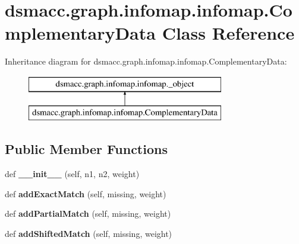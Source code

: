 \hypertarget{classdsmacc_1_1graph_1_1infomap_1_1infomap_1_1ComplementaryData}{}\section{dsmacc.\+graph.\+infomap.\+infomap.\+Complementary\+Data Class Reference}
\label{classdsmacc_1_1graph_1_1infomap_1_1infomap_1_1ComplementaryData}
Inheritance diagram for dsmacc.\+graph.\+infomap.\+infomap.\+Complementary\+Data\+:\begin{figure}[H]
\begin{center}
\leavevmode
\includegraphics[height=2.000000cm]{classdsmacc_1_1graph_1_1infomap_1_1infomap_1_1ComplementaryData}
\end{center}
\end{figure}
\subsection*{Public Member Functions}
\begin{DoxyCompactItemize}
\item 
\mbox{\label{classdsmacc_1_1graph_1_1infomap_1_1infomap_1_1ComplementaryData_ab8f232d35a207588ea7eb93b89d7d512}} 
def {\bfseries \+\_\+\+\_\+init\+\_\+\+\_\+} (self, n1, n2, weight)
\item 
\mbox{\label{classdsmacc_1_1graph_1_1infomap_1_1infomap_1_1ComplementaryData_ad8d709752299bf3d4cda6f023b5e9050}} 
def {\bfseries add\+Exact\+Match} (self, missing, weight)
\item 
\mbox{\label{classdsmacc_1_1graph_1_1infomap_1_1infomap_1_1ComplementaryData_ad6e106067033d7b4db5b5f34591d8255}} 
def {\bfseries add\+Partial\+Match} (self, missing, weight)
\item 
\mbox{\label{classdsmacc_1_1graph_1_1infomap_1_1infomap_1_1ComplementaryData_a6ca35f5cb881391397e9ddb71fb2032d}} 
def {\bfseries add\+Shifted\+Match} (self, missing, weight)
\end{DoxyCompactItemize}
